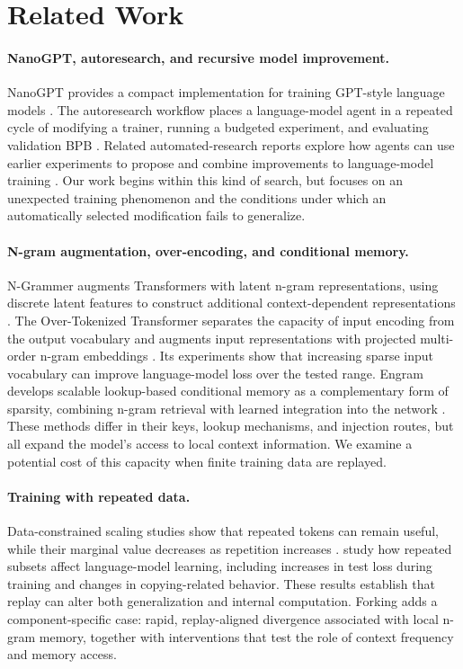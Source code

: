\section{Related Work}
\label{sec:related}

\paragraph{NanoGPT, autoresearch, and recursive model improvement.}
NanoGPT provides a compact implementation for training GPT-style language models \citep{karpathy2022nanogpt}. The autoresearch workflow places a language-model agent in a repeated cycle of modifying a trainer, running a budgeted experiment, and evaluating validation BPB \citep{karpathy2026autoresearch}. Related automated-research reports explore how agents can use earlier experiments to propose and combine improvements to language-model training \citep{recursive2026research}. Our work begins within this kind of search, but focuses on an unexpected training phenomenon and the conditions under which an automatically selected modification fails to generalize.

\paragraph{N-gram augmentation, over-encoding, and conditional memory.}
N-Grammer augments Transformers with latent n-gram representations, using discrete latent features to construct additional context-dependent representations \citep{roy2022ngrammer}. The Over-Tokenized Transformer separates the capacity of input encoding from the output vocabulary and augments input representations with projected multi-order n-gram embeddings \citep{huang2025over}. Its experiments show that increasing sparse input vocabulary can improve language-model loss over the tested range. Engram develops scalable lookup-based conditional memory as a complementary form of sparsity, combining n-gram retrieval with learned integration into the network \citep{cheng2026engram}. These methods differ in their keys, lookup mechanisms, and injection routes, but all expand the model's access to local context information. We examine a potential cost of this capacity when finite training data are replayed.

\paragraph{Training with repeated data.}
Data-constrained scaling studies show that repeated tokens can remain useful, while their marginal value decreases as repetition increases \citep{muennighoff2023scaling}. \citet{hernandez2022repeated} study how repeated subsets affect language-model learning, including increases in test loss during training and changes in copying-related behavior. These results establish that replay can alter both generalization and internal computation. Forking adds a component-specific case: rapid, replay-aligned divergence associated with local n-gram memory, together with interventions that test the role of context frequency and memory access.

